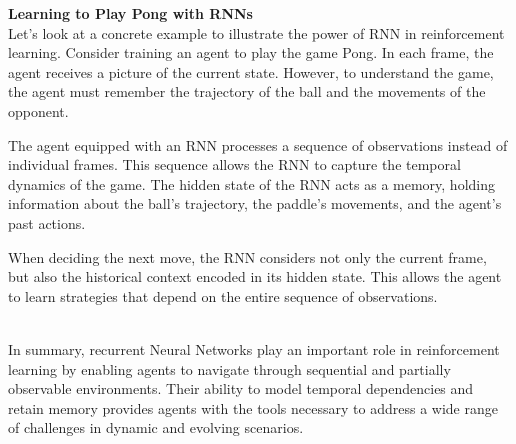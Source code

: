 \documentclass{article}
\begin{document}
\begin{mdframed}[hidealllines=true,backgroundcolor=gray!20]
\textbf{Learning to Play Pong with RNNs}\\
Let's look at a concrete example to illustrate the power of RNN in reinforcement learning. Consider training an agent to play the game Pong. In each frame, the agent receives a picture of the current state. However, to understand the game, the agent must remember the trajectory of the ball and the movements of the opponent.

The agent equipped with an RNN processes a sequence of observations instead of individual frames. This sequence allows the RNN to capture the temporal dynamics of the game. The hidden state of the RNN acts as a memory, holding information about the ball's trajectory, the paddle's movements, and the agent's past actions.

When deciding the next move, the RNN considers not only the current frame, but also the historical context encoded in its hidden state. This allows the agent to learn strategies that depend on the entire sequence of observations.
\end{mdframed}\\

In summary, recurrent Neural Networks play an important role in reinforcement learning by enabling agents to navigate through sequential and partially observable environments. Their ability to model temporal dependencies and retain memory provides agents with the tools necessary to address a wide range of challenges in dynamic and evolving scenarios.
\end{document}
